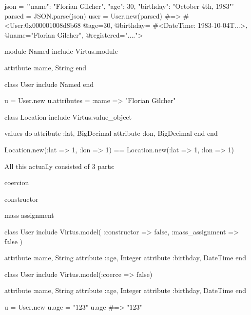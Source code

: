 \startstandardmakeup[align=middle]
\startRUBY
json = '{"name": "Florian Gilcher",
         "age": 30,
         "birthday": "October 4th, 1983"}'
parsed = JSON.parse(json)
user = User.new(parsed)
#=> #<User:0x000001008d8b68
 @age=30,
 @birthday=
  #<DateTime: 1983-10-04T...>,
 @name="Florian Gilcher",
 @registered="....">
\stopRUBY
\stopstandardmakeup

\page

\startstandardmakeup[align=middle]
\startRUBY
module Named
  include Virtus.module

  attribute :name, String
end

class User
  include Named
end

u = User.new
u.attributes = {:name => "Florian Gilcher"}
\stopRUBY
\stopstandardmakeup

\page

\startstandardmakeup[align=middle]
\startRUBY
class Location 
  include Virtus.value_object

  values do
    attribute :lat, BigDecimal
    attribute :lon, BigDecimal
  end
end

Location.new(:lat => 1, :lon => 1) == 
  Location.new(:lat => 1, :lon => 1)
\stopRUBY
\stopstandardmakeup

\page

All this actually consisted of 3 parts:

\startitemize
\item coercion
\item constructor
\item mass assignment
\stopitemize

\page

\startstandardmakeup[align=middle]
\startRUBY

class User
  include Virtus.model(
    :constructor => false,
    :mass_assignment => false
  )

  attribute :name, String
  attribute :age, Integer
  attribute :birthday, DateTime
end

\stopRUBY
\stopstandardmakeup

\page

\startstandardmakeup[align=middle]
\startRUBY

class User
  include Virtus.model(:coerce => false)

  attribute :name, String
  attribute :age, Integer
  attribute :birthday, DateTime
end

u = User.new
u.age = "123"
u.age #=> "123"

\stopRUBY
\stopstandardmakeup

